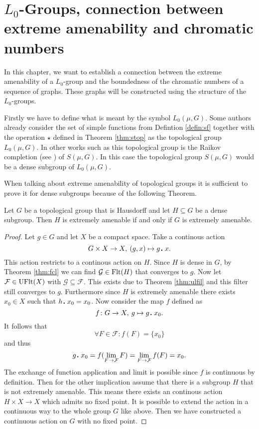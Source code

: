 \section{$L_0$-Groups, connection between extreme amenability and chromatic numbers}\label{sec:l0groups}
In this chapter, we want to establish a connection between the extreme amenability of a $L_0$-group and the boundedness of the chromatic numbers of a sequence of graphs.
These graphs will be constructed using the structure of the $L_0$-groups.

Firstly we have to define what is meant by the symbol $L_0(\mu, G)$. Some authors already consider the set of simple functions from Defintion \ref{defin:sf} together with the operation $\star$ defined in Theorem \ref{thm:stop} as the topological group $L_0(\mu, G)$. In other works such as \cite{sl2024} this topological group is the Raikov completion (see \cite[Chapter 3.6]{atop2008}) of $S(\mu, G)$. In this case the topological group $S(\mu, G)$ would be a dense subgroup of $L_0(\mu, G)$.   

When talking about extreme amenability of topological groups it is sufficient to prove it for dense subgroups because of the following Theorem. 
\begin{thm}\label{thm:da}
  Let $G$ be a topological group that is Hausdorff and let $H \subseteq G$ be a dense subgroup. Then $H$ is extremely amenable if and only if $G$ is extremely amenable. 
\end{thm}

\begin{proof}
  Let $g \in G$ and let $X$ be a compact space. Take a continous action \[G \times X \to X, \: (g, x) \mapsto g \anddot x.\] This action restricts to a continous action on $H$. Since $H$ is dense in $G$, by Theorem \ref{thm:fcl} we can find $\mathcal{G} \in {\rm Flt}(H)$ that converges to $g$. Now let $\mathcal{F} \in {\rm UFlt}(X)$ with $\mathcal{G} \subseteq \mathcal{F}$. This exists due to Theorem \ref{thm:ulfil} and this filter still converges to $g$. Furthermore since $H$ is extremely amenable there exists $x_0 \in X$ such that $h \anddot x_0 = x_0$. Now consider the map $f$ defined as \[f\colon G \to X, \: g \mapsto g\anddot x_0.\] It follows that \[\forall F\in \mathcal{F}\colon f(F) = \{x_0\}\] and thus \[g\anddot x_0 = f(\lim\limits_{F \to \mathcal{F}}F) = \lim\limits_{F\to \mathcal{F}} f(F) = x_0.\] The exchange of function application and limit is possible since $f$ is continuous by definition.
  Then for the other implication assume that there is a subgroup $H$ that is not extremely amenable. This means there exists an continous action $H \times X \to X$ which admits no fixed point. It is possible to extend the action in a continuous way to the whole group $G$ like above. Then we have constructed a continuous action on $G$ with no fixed point.
\end{proof}

